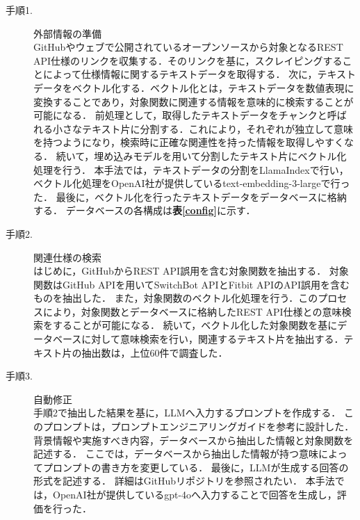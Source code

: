 \documentclass[uplatex,dvipdfmx,a4paper,twocolumn,base=12pt,jbase=12pt,ja=standard]{bxjsarticle}
\begin{document}

\begin{description}
    \item[手順1. ] 外部情報の準備 \\
    GitHubやウェブで公開されているオープンソースから対象となるREST API仕様のリンクを収集する．そのリンクを基に，スクレイピングすることによって仕様情報に関するテキストデータを取得する．
    次に，テキストデータをベクトル化する．ベクトル化とは，テキストデータを数値表現に変換することであり，対象関数に関連する情報を意味的に検索することが可能になる．
    前処理として，取得したテキストデータをチャンクと呼ばれる小さなテキスト片に分割する．これにより，それぞれが独立して意味を持つようになり，検索時に正確な関連性を持った情報を取得しやすくなる．
    続いて，埋め込みモデルを用いて分割したテキスト片にベクトル化処理を行う．
    本手法では，テキストデータの分割をLlamaIndexで行い，ベクトル化処理をOpenAI社が提供しているtext-embedding-3-largeで行った．
    最後に，ベクトル化を行ったテキストデータをデータベースに格納する．
    データベースの各構成は\textbf{表\ref{config}}に示す．

    \item[手順2. ] 関連仕様の検索 \\
    はじめに，GitHubからREST API誤用を含む対象関数を抽出する．
    対象関数はGitHub APIを用いてSwitchBot APIとFitbit APIのAPI誤用を含むものを抽出した．
    また，対象関数のベクトル化処理を行う．このプロセスにより，対象関数とデータベースに格納したREST API仕様との意味検索をすることが可能になる．
    続いて，ベクトル化した対象関数を基にデータベースに対して意味検索を行い，関連するテキスト片を抽出する．テキスト片の抽出数は，上位60件で調査した．
    
    \item[手順3. ] 自動修正 \\
    手順2で抽出した結果を基に，LLMへ入力するプロンプトを作成する．
    このプロンプトは，プロンプトエンジニアリングガイド\cite{prompt}を参考に設計した．
    \newpage
    背景情報や実施すべき内容，データベースから抽出した情報と対象関数を記述する．
    ここでは，データベースから抽出した情報が持つ意味によってプロンプトの書き方を変更している．
    最後に，LLMが生成する回答の形式を記述する．
    詳細はGitHubリポジトリ\footnotemark{}を参照されたい．
    本手法では，OpenAI社が提供しているgpt-4oへ入力することで回答を生成し，評価を行った．
\end{description}

\addtocounter{footnote}{-1}
\end{document}
